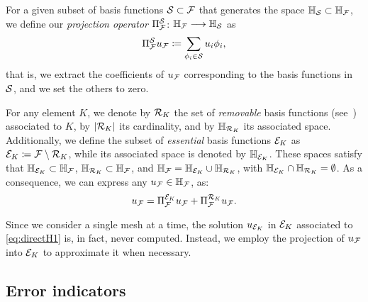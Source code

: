 {{{For a given subset of basis functions $\mathcal{S}\subset \mathcal{F}$ that generates the space $\mathbb{H}_{\mathcal{S}} \subset \mathbb{H}_{\mathcal{F}}$, we define our \emph{projection operator} $\Pi_{\mathcal{F}}^{\mathcal{S}}$: $\mathbb{H} _{\mathcal{F}} \longrightarrow \mathbb{H}_{\mathcal{S}}$ as
\begin{equation}
  \Pi_{\mathcal{F}}^{\mathcal{S}} u_{\mathcal{F}} \coloneqq \sum_{\phi_{i} \in \mathcal{S}} u_{i} \phi_{i},
\end{equation}
that is, we extract the coefficients of $u_{\mathcal{F}}$ corresponding to the basis functions in $\mathcal{S}$, and we set the others to zero.

For any element $K$, we denote by $\mathcal{R}_K$ the set of \emph{removable} basis functions (see~) associated to $K$, by $\left|\mathcal{R}_K\right|$ its cardinality, and by $\mathbb{H}_{\mathcal{R}_K}$ its associated space. Additionally, we define the subset of \emph{essential} basis functions $\mathcal{E}_K$ as $\mathcal{E}_K \coloneqq \mathcal{F} \setminus \mathcal{R}_K$, while its associated space is denoted by $\mathbb{H}_{\mathcal{E}_K}$. These spaces satisfy that $\mathbb{H}_{\mathcal{E}_K} \subset \mathbb{H}_{\mathcal{F}}$, $\mathbb{H}_{\mathcal{R}_K} \subset \mathbb{H}_{\mathcal{F}}$, and $\mathbb{H}_{\mathcal{F}} = \mathbb{H}_{\mathcal{E}_K} \cup \mathbb{H}_{\mathcal{R}_K}$, with $\mathbb{H}_{\mathcal{E}_K}\cap \mathbb{H}_{\mathcal{R}_K} = \emptyset$. As a consequence, we can express any $u_{\mathcal{F}} \in \mathbb{H}_{\mathcal{F}}$, as:
\begin{equation}
  u_{\mathcal{F}} =  \Pi_{\mathcal{F}}^{\mathcal{E}_K} u_{\mathcal{F}} + \Pi_{\mathcal{F}}^{\mathcal{R}_K} u_{\mathcal{F}}.\label{eq:decomposition}
\end{equation}


Since we consider a single mesh at a time, the solution $u_{\mathcal{E}_K}$ in $\mathcal{E}_K$ associated to \cref{eq:directH1} is, in fact, never computed. Instead, we employ the projection of $u_{\mathcal{F}}$ into $\mathcal{E}_K$ to approximate it when necessary.


\subsection{Error indicators}

}}}
